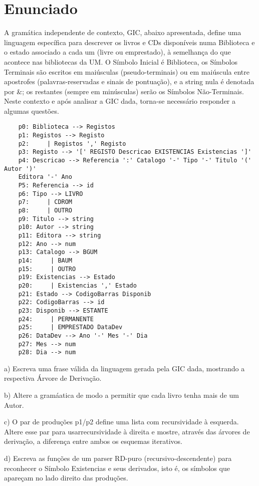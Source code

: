 \section{Enunciado}

A gramática independente de contexto, GIC, abaixo apresentada, define uma linguagem específica para descrever os livros e CDs disponíveis numa Biblioteca e o estado associado a cada um (livre ou emprestado), à semelhança do que acontece nas bibliotecas da UM.
O Símbolo Inicial é Biblioteca, os Símbolos Terminais são escritos em maiúsculas (pseudo-terminais) ou em maiúscula entre apostrofes (palavras-reservadas e sinais de pontuação), e a string nula é denotada por \&; os restantes (sempre em minúsculas) serão os Símbolos Não-Terminais.
Neste contexto e após analisar a GIC dada, torna-se necessário responder a algumas questões.
\begin{verbatim}
    p0: Biblioteca --> Registos
    p1: Registos --> Registo
    p2:     | Registos ',' Registo
    p3: Registo --> '[' REGISTO Descricao EXISTENCIAS Existencias ']'
    p4: Descricao --> Referencia ':' Catalogo '-' Tipo '-' Titulo '(' Autor ')'
    Editora '-' Ano
    P5: Referencia --> id
    p6: Tipo --> LIVRO
    p7:     | CDROM
    p8:     | OUTRO
    p9: Titulo --> string
    p10: Autor --> string
    p11: Editora --> string
    p12: Ano --> num
    p13: Catalogo --> BGUM
    p14:     | BAUM
    p15:     | OUTRO
    p19: Existencias --> Estado
    p20:     | Existencias ',' Estado
    p21: Estado --> CodigoBarras Disponib
    p22: CodigoBarras --> id
    p23: Disponib --> ESTANTE
    p24:     | PERMANENTE
    p25:     | EMPRESTADO DataDev
    p26: DataDev --> Ano '-' Mes '-' Dia
    p27: Mes --> num
    p28: Dia --> num

\end{verbatim}


a) Escreva uma frase válida da linguagem gerada pela GIC dada, mostrando a respectiva Árvore de Derivação.

b) Altere a gramáatica de modo a permitir que cada livro tenha mais de um Autor.

c) O par de produções p1/p2 define uma lista com recursividade à esquerda. Altere esse par para usarrecursividade à direita e mostre, através das árvores de derivação, a diferença entre ambos os esquemas iterativos.

d) Escreva as funções de um parser RD-puro (recursivo-descendente) para reconhecer o Símbolo Existencias e seus derivados, isto é, os símbolos que apareçam no lado direito das produções.

